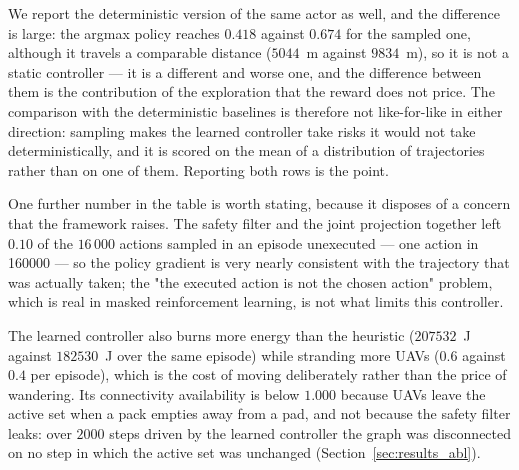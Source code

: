 \documentclass[conference]{IEEEtran}
\begin{document}
We report the
deterministic version of the same actor as
well, and the difference is large: the argmax policy reaches $0.418$
against $0.674$ for the sampled one, although it travels a comparable
distance ($5044$~m against $9834$~m), so it is
not a static controller --- it is a different and worse one, and the
difference between them is the contribution of the exploration that the
reward does not price.  The comparison with the deterministic baselines is
therefore not like-for-like in either direction: sampling makes the learned
controller take risks it would not take deterministically, and it is scored
on the mean of a distribution of trajectories rather than on one of them.
Reporting both rows is the point.

One further number in the table is worth stating, because it disposes of a
concern that the framework raises.  The safety filter and the joint
projection together left $0.10$ of the $16\,000$
actions sampled in an episode unexecuted --- one action in 160000 --- so the
policy gradient is very nearly
consistent with the trajectory that was actually taken; the
"the executed action is not the chosen action" problem, which is real in
masked reinforcement learning, is not what limits this controller.

The learned controller also burns more energy than the heuristic
($207532$~J against $182530$~J over the same episode) while
stranding more UAVs ($0.6$ against $0.4$ per
episode), which is the cost of moving deliberately rather than the price of
wandering.  Its connectivity availability is
below $1.000$ because UAVs leave the active set when a pack empties away
from a pad, and not because the safety filter leaks: over $2000$
steps driven by the learned controller the graph was disconnected on no step in
which the active set was unchanged (Section~\ref{sec:results_abl}).
\end{document}

